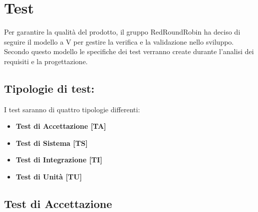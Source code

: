 \section{Test}
	Per garantire la qualità del prodotto, il gruppo RedRoundRobin ha deciso di seguire il modello a V per gestire la verifica e la validazione nello sviluppo. Secondo questo modello le specifiche dei test verranno create durante l'analisi dei requisiti e la progettazione.
	

	\subsection{Tipologie di test:}
		I test saranno di quattro tipologie differenti:
		\begin{itemize}

			\item \textbf{Test di Accettazione [TA]}
			\item \textbf{Test di Sistema [TS]}
			\item \textbf{Test di Integrazione [TI]}
			\item \textbf{Test di Unità [TU]}

		\end{itemize}

	\subsection{Test di Accettazione}
		
